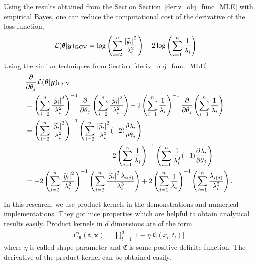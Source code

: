 \documentclass{iitthesis}          %
\newcommand{\bm}[1]{\boldsymbol{#1}}
\newcommand{\vtheta}{{\bm{\theta}}}
\newcommand{\vt}{\bm{t}}
\newcommand{\vx}{\bm{x}}
\newcommand{\vy}{\bm{y}}
\newcommand{\GCV}{\textup{GCV}}
\def\abs#1{\ensuremath{\left \lvert #1 \right \rvert}}
\newcommand\secref{Section~\ref}
\begin{document}
Using the results obtained from the Section \secref{deriv_obj_func_MLE} with empirical Bayes, one can reduce the computational cost of the derivative of the loss function,
\begin{align*}
\mathcal{L}(\vtheta | \vy)_\GCV
&= \log \left ( \sum_{i=2}^n \frac{\abs{\widetilde{y}_i}^2}{\lambda_i^2} 
\right) -2\log\left( \sum_{i=1}^n \frac{1}{\lambda_i} \right)
\end{align*}
Using the similar techniques from \secref{deriv_obj_func_MLE}
\begin{align*}
& \frac{\partial}{\partial \theta_j}  \mathcal{L}(\vtheta | \vy)_\GCV
\\
&= \left ( \sum_{i=2}^n \frac{\abs{\widetilde{y}_i}^2}{\lambda_i^2} \right)^{-1}
\frac{\partial}{\partial \theta_j} \left ( \sum_{i=2}^n \frac{\abs{\widetilde{y}_i}^2}{\lambda_i^2} \right)
 -2 \left( \sum_{i=1}^n \frac{1}{\lambda_i} \right)^{-1}
\frac{\partial}{\partial \theta_j} \left( \sum_{i=1}^n \frac{1}{\lambda_i} \right)
\\
&= \left ( \sum_{i=2}^n \frac{\abs{\widetilde{y}_i}^2}{\lambda_i^2} \right)^{-1}
 \left ( \sum_{i=2}^n \frac{\abs{\widetilde{y}_i}^2}{\lambda_i^3} (-2) \frac{\partial\lambda_i}{\partial \theta_j}  \right)
\\ & \hspace{4cm} 
-2 \left( \sum_{i=1}^n \frac{1}{\lambda_i} \right)^{-1}
\left( \sum_{i=1}^n \frac{1}{\lambda_i^2} (-1)\frac{\partial \lambda_i}{\partial \theta_j}  \right)
\\
&= -2 \left ( \sum_{i=2}^n \frac{\abs{\widetilde{y}_i}^2}{\lambda_i^2} \right)^{-1}
\left ( \sum_{i=2}^n \frac{\abs{\widetilde{y}_i}^2 \bar{\lambda}_{i(j)} }{\lambda_i^3}    \right)
+ 2 \left( \sum_{i=1}^n \frac{1}{\lambda_i} \right)^{-1}
\left( \sum_{i=1}^n \frac{\bar{\lambda}_{i(j)} }{\lambda_i^2}  \right).
\end{align*}



In this research, we use product kernels in the demonstrations and numerical implementations. They got nice properties which are helpful to obtain analytical results easily. Product kernels in $d$ dimensions are of the form,
\begin{align}
\label{eqn:prod_kernel}
C_\vtheta(\vt, \vx) = 
\prod_{l=1}^d \biggl[ 1 - \eta \; \mathfrak{C}(x_l,t_l) \biggr]
\end{align}
where $\eta$ is called shape parameter and $\mathfrak{C}$ is some positive definite function. The derivative of the product kernel can be obtained easily.
\end{document}
